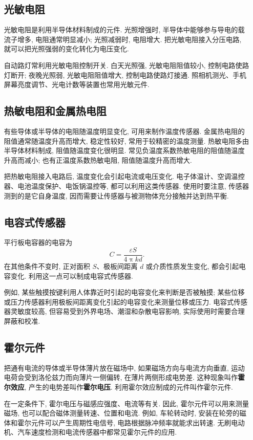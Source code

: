 \documentclass[UTF8,openany,fontset=fandol]{ctexbook}
\theoremstyle{chinesetextbook}
\begin{document}
\subsection{光敏电阻}
光敏电阻是利用半导体材料制成的元件. 光照增强时, 半导体中能够参与导电的载流子增多, 电阻通常明显减小; 光照减弱时, 电阻增大. 把光敏电阻接入分压电路, 就可以把光照强弱的变化转化为电压变化.

自动路灯常利用光敏电阻控制开关. 白天光照强, 光敏电阻阻值较小, 控制电路使路灯断开; 夜晚光照弱, 光敏电阻阻值增大, 控制电路使路灯接通. 照相机测光、手机屏幕亮度调节、光电计数等装置也常用光敏元件.
\subsection{热敏电阻和金属热电阻}
有些导体或半导体的电阻随温度明显变化, 可用来制作温度传感器. 金属热电阻的阻值通常随温度升高而增大, 稳定性较好, 常用于较精密的温度测量. 热敏电阻多由半导体材料制成, 阻值随温度变化很明显. 常见负温度系数热敏电阻的阻值随温度升高而减小; 也有正温度系数热敏电阻, 阻值随温度升高而增大.

把热敏电阻接入电路后, 温度变化会引起电流或电压变化. 电子体温计、空调温控器、电池温度保护、电饭锅温控等, 都可以利用这类传感器. 使用时要注意, 传感器测到的是它自身温度, 因而需要让传感器与被测物体充分接触并达到热平衡.
\subsection{电容式传感器}
平行板电容器的电容为
\[
C=\frac{\varepsilon S}{4\uppi k d}.
\]
在其他条件不变时, 正对面积 $S$、极板间距离 $d$ 或介质性质发生变化, 都会引起电容变化. 利用这一点可以制成电容式传感器.

例如, 某些触摸按键利用人体靠近时引起的电容变化来判断是否被触摸; 某些位移或压力传感器利用极板间距离变化引起的电容变化来测量位移或压力. 电容式传感器灵敏度较高, 但容易受到外界电场、潮湿和杂散电容影响, 实际使用时需要合理屏蔽和校准.
\subsection{霍尔元件}
把通有电流的导体或半导体薄片放在磁场中, 如果磁场方向与电流方向垂直, 运动电荷会受到洛伦兹力而向薄片一侧偏转, 在薄片两侧形成电势差. 这种现象叫作\textbf{霍尔效应}, 产生的电势差叫作\textbf{霍尔电压}. 利用霍尔效应制成的元件叫作霍尔元件.

在一定条件下, 霍尔电压与磁感应强度、电流等有关. 因此, 霍尔元件可以用来测量磁场, 也可以配合磁体测量转速、位置和电流. 例如, 车轮转动时, 安装在轮旁的磁体和霍尔元件可以产生周期性电信号, 电路根据脉冲频率就能求出转速. 无刷电动机、汽车速度检测和电流传感器中都常见霍尔元件的应用.
\end{document}

